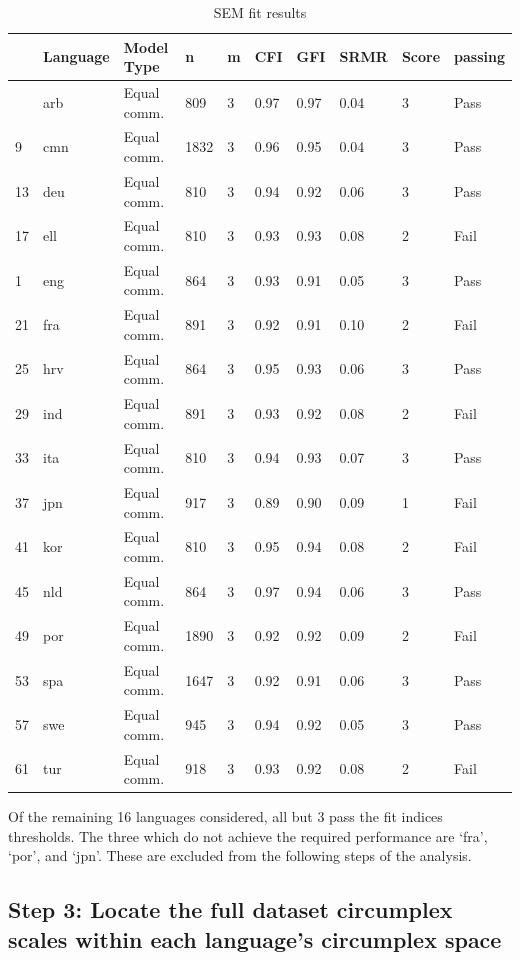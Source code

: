 \documentclass[
  authoryear,
  preprint,
  3p]{elsarticle}
\begin{document}
\begin{longtable}[]{@{}llllllllll@{}}

\caption{\label{tbl-sem-res}SEM fit results}

\tabularnewline

\toprule\noalign{}
& Language & Model Type & n & m & CFI & GFI & SRMR & Score & passing \\
\midrule\noalign{}
\endhead
\bottomrule\noalign{}
\endlastfoot
5 & arb & Equal comm. & 809 & 3 & 0.97 & 0.97 & 0.04 & 3 & Pass \\
9 & cmn & Equal comm. & 1832 & 3 & 0.96 & 0.95 & 0.04 & 3 & Pass \\
13 & deu & Equal comm. & 810 & 3 & 0.94 & 0.92 & 0.06 & 3 & Pass \\
17 & ell & Equal comm. & 810 & 3 & 0.93 & 0.93 & 0.08 & 2 & Fail \\
1 & eng & Equal comm. & 864 & 3 & 0.93 & 0.91 & 0.05 & 3 & Pass \\
21 & fra & Equal comm. & 891 & 3 & 0.92 & 0.91 & 0.10 & 2 & Fail \\
25 & hrv & Equal comm. & 864 & 3 & 0.95 & 0.93 & 0.06 & 3 & Pass \\
29 & ind & Equal comm. & 891 & 3 & 0.93 & 0.92 & 0.08 & 2 & Fail \\
33 & ita & Equal comm. & 810 & 3 & 0.94 & 0.93 & 0.07 & 3 & Pass \\
37 & jpn & Equal comm. & 917 & 3 & 0.89 & 0.90 & 0.09 & 1 & Fail \\
41 & kor & Equal comm. & 810 & 3 & 0.95 & 0.94 & 0.08 & 2 & Fail \\
45 & nld & Equal comm. & 864 & 3 & 0.97 & 0.94 & 0.06 & 3 & Pass \\
49 & por & Equal comm. & 1890 & 3 & 0.92 & 0.92 & 0.09 & 2 & Fail \\
53 & spa & Equal comm. & 1647 & 3 & 0.92 & 0.91 & 0.06 & 3 & Pass \\
57 & swe & Equal comm. & 945 & 3 & 0.94 & 0.92 & 0.05 & 3 & Pass \\
61 & tur & Equal comm. & 918 & 3 & 0.93 & 0.92 & 0.08 & 2 & Fail \\

\end{longtable}

Of the remaining 16 languages considered, all but 3 pass the fit indices
thresholds. The three which do not achieve the required performance are
`fra', `por', and `jpn'. These are excluded from the following steps of
the analysis.

\subsection{Step 3: Locate the full dataset circumplex scales within
each language's circumplex
space}\label{step-3-locate-the-full-dataset-circumplex-scales-within-each-languages-circumplex-space-1}
\end{document}
